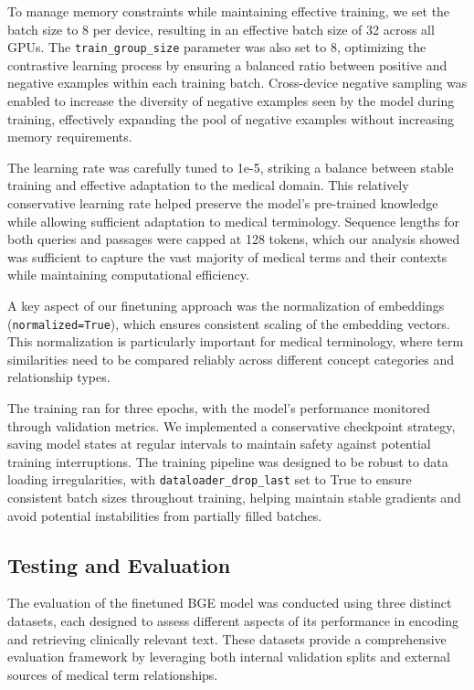 To manage memory constraints while maintaining effective training, we set the batch size to 8 per device, resulting in an effective batch size of 32 across all GPUs. The \texttt{train\_group\_size} parameter was also set to 8, optimizing the contrastive learning process by ensuring a balanced ratio between positive and negative examples within each training batch. Cross-device negative sampling was enabled to increase the diversity of negative examples seen by the model during training, effectively expanding the pool of negative examples without increasing memory requirements.

The learning rate was carefully tuned to 1e-5, striking a balance between stable training and effective adaptation to the medical domain. This relatively conservative learning rate helped preserve the model's pre-trained knowledge while allowing sufficient adaptation to medical terminology. Sequence lengths for both queries and passages were capped at 128 tokens, which our analysis showed was sufficient to capture the vast majority of medical terms and their contexts while maintaining computational efficiency.

A key aspect of our finetuning approach was the normalization of embeddings (\texttt{normalized=True}), which ensures consistent scaling of the embedding vectors. This normalization is particularly important for medical terminology, where term similarities need to be compared reliably across different concept categories and relationship types.

The training ran for three epochs, with the model's performance monitored through validation metrics. We implemented a conservative checkpoint strategy, saving model states at regular intervals to maintain safety against potential training interruptions. The training pipeline was designed to be robust to data loading irregularities, with \texttt{dataloader\_drop\_last} set to True to ensure consistent batch sizes throughout training, helping maintain stable gradients and avoid potential instabilities from partially filled batches.

\subsection{Testing and Evaluation}
\label{subsec:testing_evaluation}

The evaluation of the finetuned BGE model was conducted using three distinct datasets, each designed to assess different aspects of its performance in encoding and retrieving clinically relevant text. These datasets provide a comprehensive evaluation framework by leveraging both internal validation splits and external sources of medical term relationships.

